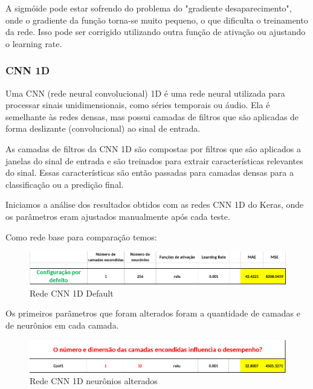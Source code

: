 \documentclass[10pt]{article}
\begin{document}
A sigmóide pode estar sofrendo do problema do "gradiente desaparecimento", 
onde o gradiente da função torna-se muito pequeno, o que dificulta o 
treinamento da rede. Isso pode ser corrigido utilizando outra função de 
ativação ou ajustando o learning rate.

\subsubsection{CNN 1D}
Uma CNN (rede neural convolucional) 1D é uma rede neural utilizada 
para processar sinais unidimensionais, como séries temporais ou áudio. Ela 
é semelhante às redes densas, mas possui camadas de filtros que são aplicadas 
de forma deslizante (convolucional) ao sinal de entrada.

As camadas de filtros da CNN 1D são compostas por filtros que são aplicados a 
janelas do sinal de entrada e são treinados para extrair características 
relevantes do sinal. Essas características são então passadas para camadas 
densas para a classificação ou a predição final.

Iniciamos a análise dos resultados obtidos com as redes CNN 1D do Keras, 
onde os parâmetros eram ajustados manualmente após cada teste.

\newpage
Como rede base para comparação temos:

\begin{figure}[htb]
  \centering
  \includegraphics[width=\linewidth]{img/cnn_default.png}
  \caption{Rede CNN 1D Default}
  \label{fig:cnn_default}
\end{figure}

\vspace{1cm}
Os primeiros parâmetros que foram alterados foram a quantidade de 
camadas e de neurônios em cada camada.

\begin{figure}[htb]
  \centering
  \includegraphics[width=\linewidth]{img/cnn_neuronios.png}
  \caption{Rede CNN 1D neurônios alterados}
  \label{fig:cnn_neuronios}
\end{figure}
\end{document}
